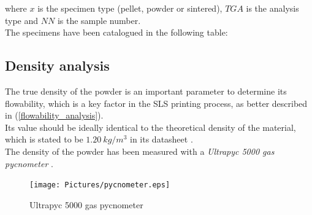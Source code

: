 \documentclass{article}
\begin{document}
            where $x$ is the specimen type (pellet, powder or sintered), $TGA$ is the analysis type and $NN$ is the sample number. \\

            The specimens have been catalogued in the following table:

                    \begin{table}[h!]
                        \centering
                        \caption{TGA specimens}
                        \label{tab:TGA_specimens}
                    \end{table}

        \clearpage

        \subsection{Density analysis\label{density_measurement}}
        The true density of the powder is an important parameter to determine its flowability, which is a key factor in the
        SLS printing process, as better described in (\ref{flowability_analysis}). \\
        
        Its value should be ideally identical to the theoretical density of the material, which is stated to be 
        $1.20 \ kg/m^3$ in its datasheet \autocites{GruppoMaip}. \\ 
        
        The density of the powder has been measured with a \textit{Ultrapyc 5000 gas
        pycnometer} \autocites{Ultrapyc5000}. \\ 
    
        \begin{figure}[h!]
            \centering
            \texttt{[image: Pictures/pycnometer.eps]}
            \caption{Ultrapyc 5000 gas pycnometer \autocites{Ultrapyc5000}}
            \label{fig:ultrapyc5000}
        \end{figure}
    
\end{document}
